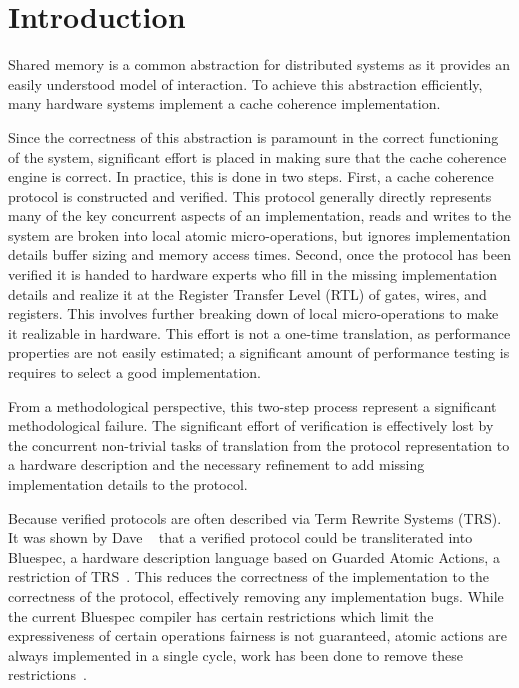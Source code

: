 \section{Introduction}
\label{sec:Introduction}

Shared memory is a common abstraction for distributed systems as it
provides an easily understood model of interaction. To achieve this
abstraction efficiently, many hardware systems implement a cache
coherence implementation. 

Since the correctness of this abstraction is paramount in the correct
functioning of the system, significant effort is placed in making sure
that the cache coherence engine is correct. In practice, this is done
in two steps. First, a cache coherence protocol is constructed and
verified. This protocol generally directly represents many of
the key concurrent aspects of an implementation, \eg{} reads and
writes to the system are broken into local atomic micro-operations, but
ignores implementation details \eg{} buffer sizing and memory access
times. Second, once the protocol has been verified it is handed to
hardware experts who fill in the missing implementation details and
realize it at the Register Transfer Level (RTL) of gates, wires, and
registers. This involves further breaking down of local micro-operations to
make it realizable in hardware. This effort is not a one-time translation, as
performance properties are not easily estimated; a significant amount of
performance testing is requires to select a good implementation. 

From a methodological perspective, this two-step process represent a
significant methodological failure. The significant effort of
verification is effectively lost by the concurrent non-trivial tasks
of translation from the protocol representation to a hardware
description and the necessary refinement to add missing implementation
details to the protocol. 

Because verified protocols are often described via Term Rewrite
Systems (TRS). It was shown by Dave
\etal{}~\cite{DNA:CoherenceImplementation} that a verified protocol
could be transliterated into Bluespec, a hardware description language
based on Guarded Atomic Actions, a restriction of
TRS~\cite{Hoe:TCAD}. This reduces the correctness of the
implementation to the correctness of the protocol, effectively
removing any implementation bugs. While the current Bluespec compiler
has certain restrictions which limit the expressiveness of certain
operations \eg{} fairness is not guaranteed, atomic actions are always
implemented in a single cycle, work has been done to remove these
restrictions~\cite{DNA:CoherenceImplementation, Karczmarek}.

